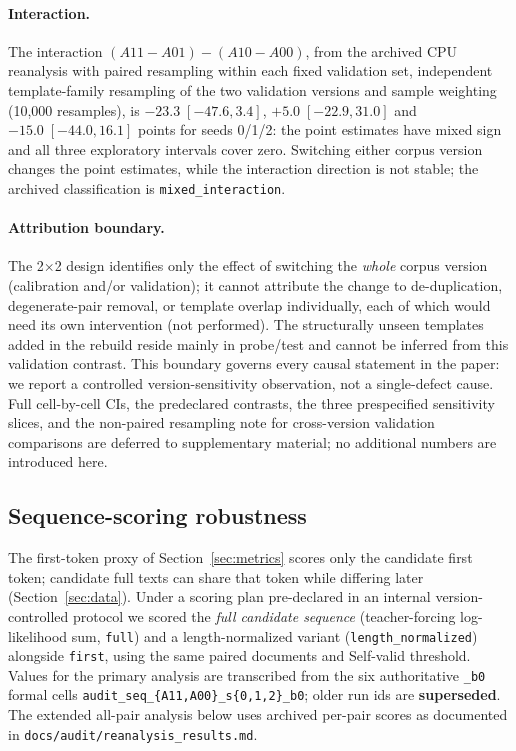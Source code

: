 \documentclass[11pt,twocolumn]{article}
\begin{document}
\paragraph{Interaction.} The interaction $(A11-A01)-(A10-A00)$, from the
archived CPU reanalysis with paired resampling within each fixed validation
set, independent template-family resampling of the two validation versions and
sample weighting (10{,}000 resamples), is $-23.3\;[-47.6,3.4]$,
$+5.0\;[-22.9,31.0]$ and $-15.0\;[-44.0,16.1]$ points for seeds 0/1/2: the
point estimates have mixed sign and all three exploratory intervals cover
zero. Switching either corpus version changes the point estimates, while the
interaction direction is not stable; the archived classification is
\texttt{mixed\_interaction}.

\paragraph{Attribution boundary.} The 2$\times$2 design identifies only the
effect of switching the \emph{whole} corpus version (calibration and/or
validation); it cannot attribute the change to de-duplication, degenerate-pair
removal, or template overlap individually, each of which would need its own
intervention (not performed). The structurally unseen templates added in the
rebuild reside mainly in probe/test and cannot be inferred from this validation
contrast. This boundary governs every causal statement in the paper: we report
a controlled version-sensitivity observation, not a single-defect cause. Full
cell-by-cell CIs, the predeclared contrasts, the three prespecified sensitivity
slices, and the non-paired resampling note for cross-version validation
comparisons are deferred to supplementary material; no additional numbers are
introduced here.

\subsection{Sequence-scoring robustness}
\label{sec:seqscore}

The first-token proxy of Section~\ref{sec:metrics} scores only the candidate
first token; candidate full texts can share that token while differing later
(Section~\ref{sec:data}). Under a scoring plan pre-declared in an internal
version-controlled protocol we scored the \emph{full candidate sequence}
(teacher-forcing log-likelihood sum, \texttt{full}) and a length-normalized
variant (\texttt{length\_normalized}) alongside \texttt{first}, using the same
paired documents and Self-valid threshold. Values for the primary analysis are
transcribed from the six authoritative \texttt{\_b0} formal cells
\texttt{audit\_seq\_\{A11,A00\}\_s\{0,1,2\}\_b0}; older run ids are
\textbf{superseded}. The extended all-pair analysis below uses archived
per-pair scores as documented in \texttt{docs/audit/reanalysis\_results.md}.
\end{document}
